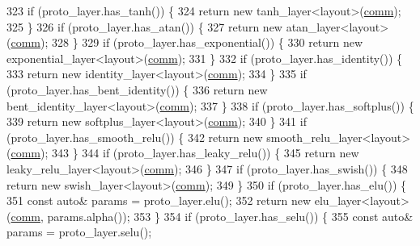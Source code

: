 \begin{DoxyCode}
323   \textcolor{keywordflow}{if} (proto\_layer.has\_tanh()) \{
324     \textcolor{keywordflow}{return} \textcolor{keyword}{new} tanh\_layer<layout>(\hyperlink{file__io_8cpp_ab048c6f9fcbcfaa57ce68b00263dbebe}{comm});
325   \}
326   \textcolor{keywordflow}{if} (proto\_layer.has\_atan()) \{
327     \textcolor{keywordflow}{return} \textcolor{keyword}{new} atan\_layer<layout>(\hyperlink{file__io_8cpp_ab048c6f9fcbcfaa57ce68b00263dbebe}{comm});
328   \}
329   \textcolor{keywordflow}{if} (proto\_layer.has\_exponential()) \{
330     \textcolor{keywordflow}{return} \textcolor{keyword}{new} exponential\_layer<layout>(\hyperlink{file__io_8cpp_ab048c6f9fcbcfaa57ce68b00263dbebe}{comm});
331   \}
332   \textcolor{keywordflow}{if} (proto\_layer.has\_identity()) \{
333     \textcolor{keywordflow}{return} \textcolor{keyword}{new} identity\_layer<layout>(\hyperlink{file__io_8cpp_ab048c6f9fcbcfaa57ce68b00263dbebe}{comm});
334   \}
335   \textcolor{keywordflow}{if} (proto\_layer.has\_bent\_identity()) \{
336     \textcolor{keywordflow}{return} \textcolor{keyword}{new} bent\_identity\_layer<layout>(\hyperlink{file__io_8cpp_ab048c6f9fcbcfaa57ce68b00263dbebe}{comm});
337   \}
338   \textcolor{keywordflow}{if} (proto\_layer.has\_softplus()) \{
339     \textcolor{keywordflow}{return} \textcolor{keyword}{new} softplus\_layer<layout>(\hyperlink{file__io_8cpp_ab048c6f9fcbcfaa57ce68b00263dbebe}{comm});
340   \}
341   \textcolor{keywordflow}{if} (proto\_layer.has\_smooth\_relu()) \{
342     \textcolor{keywordflow}{return} \textcolor{keyword}{new} smooth\_relu\_layer<layout>(\hyperlink{file__io_8cpp_ab048c6f9fcbcfaa57ce68b00263dbebe}{comm});
343   \}
344   \textcolor{keywordflow}{if} (proto\_layer.has\_leaky\_relu()) \{
345     \textcolor{keywordflow}{return} \textcolor{keyword}{new} leaky\_relu\_layer<layout>(\hyperlink{file__io_8cpp_ab048c6f9fcbcfaa57ce68b00263dbebe}{comm});
346   \}
347   \textcolor{keywordflow}{if} (proto\_layer.has\_swish()) \{
348     \textcolor{keywordflow}{return} \textcolor{keyword}{new} swish\_layer<layout>(\hyperlink{file__io_8cpp_ab048c6f9fcbcfaa57ce68b00263dbebe}{comm});
349   \}
350   \textcolor{keywordflow}{if} (proto\_layer.has\_elu()) \{
351     \textcolor{keyword}{const} \textcolor{keyword}{auto}& params = proto\_layer.elu();
352     \textcolor{keywordflow}{return} \textcolor{keyword}{new} elu\_layer<layout>(\hyperlink{file__io_8cpp_ab048c6f9fcbcfaa57ce68b00263dbebe}{comm}, params.alpha());
353   \}
354   \textcolor{keywordflow}{if} (proto\_layer.has\_selu()) \{
355     \textcolor{keyword}{const} \textcolor{keyword}{auto}& params = proto\_layer.selu();

\end{DoxyCode}
